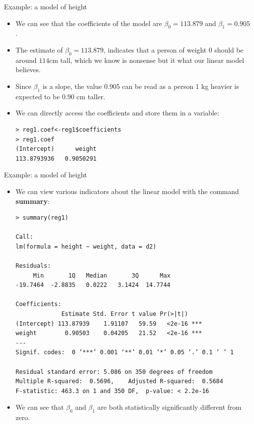 \documentclass[handout]{beamer}
\begin{document}
\begin{frame}[fragile]{Example: a model of height}
\scriptsize{

 \begin{itemize}
 
  \item We can see that the coefficients of the model are $\beta_{0}=113.879$ and $\beta_{1}=0.905$. 


\item The estimate of $\beta_{0}=113.879$, indicates that a person of weight 0 should be around $114$cm tall, which we know is nonsense but it what our linear model believes.  
 
 \item Since $\beta_1$ is a slope, the value $0.905$ can be read as a person 1 kg heavier is expected to be 0.90 cm taller.
 
 
 \item We can directly access the coefficients and store them in a variable:
 \begin{verbatim}
> reg1.coef<-reg1$coefficients
> reg1.coef
(Intercept)      weight 
113.8793936   0.9050291 
 \end{verbatim}

 
 \end{itemize}
 
 


} 
\end{frame}


\begin{frame}[fragile]{Example: a model of height}
\scriptsize{


\begin{itemize}


\item We can view various indicators about the linear model with the command \textbf{summary}:
 
\begin{verbatim}
> summary(reg1)

Call:
lm(formula = height ~ weight, data = d2)

Residuals:
     Min       1Q   Median       3Q      Max 
-19.7464  -2.8835   0.0222   3.1424  14.7744 

Coefficients:
             Estimate Std. Error t value Pr(>|t|)    
(Intercept) 113.87939    1.91107   59.59   <2e-16 ***
weight        0.90503    0.04205   21.52   <2e-16 ***
---
Signif. codes:  0 ‘***’ 0.001 ‘**’ 0.01 ‘*’ 0.05 ‘.’ 0.1 ‘ ’ 1

Residual standard error: 5.086 on 350 degrees of freedom
Multiple R-squared:  0.5696,	Adjusted R-squared:  0.5684 
F-statistic: 463.3 on 1 and 350 DF,  p-value: < 2.2e-16

\end{verbatim}
\item We can see that $\beta_0$ and $\beta_1$ are both statistically significantly different from zero.  
 
 \end{itemize}
 
 


} 
\end{frame}
\end{document}
